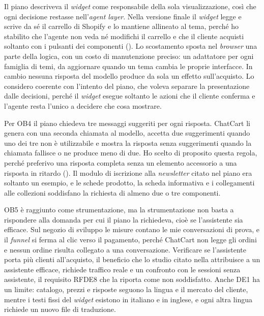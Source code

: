 Il piano descriveva il \emph{widget} come responsabile della sola visualizzazione, così che ogni
decisione restasse nell’\emph{agent layer}. Nella versione finale il \emph{widget} legge e scrive da
sé il carrello di Shopify e lo mantiene allineato al tema, perché ho stabilito che l’agente non veda
né modifichi il carrello e che il cliente acquisti soltanto con i pulsanti dei componenti
(). Lo scostamento sposta nel \emph{browser} una parte della logica, con un costo
di manutenzione preciso: un adattatore per ogni famiglia di temi, da aggiornare quando un tema
cambia le proprie interfacce. In cambio nessuna risposta del modello produce da sola un effetto
sull’acquisto. Lo considero coerente con l’intento del piano, che voleva separare la presentazione
dalle decisioni, perché il \emph{widget} esegue soltanto le azioni che il cliente conferma e
l’agente resta l’unico a decidere che cosa mostrare.

Per OB4 il piano chiedeva tre messaggi suggeriti per ogni risposta. ChatCart li genera con una
seconda chiamata al modello, accetta due suggerimenti quando uno dei tre non è utilizzabile e mostra
la risposta senza suggerimenti quando la chiamata fallisce o ne produce meno di due. Ho scelto di
proposito questa regola, perché preferivo una risposta completa senza un elemento accessorio a una
risposta in ritardo (). Il modulo di iscrizione alla \emph{newsletter} citato nel
piano era soltanto un esempio, e le schede prodotto, la scheda informativa e i collegamenti alle
collezioni soddisfano la richiesta di almeno due o tre componenti.

OB5 è raggiunto come strumentazione, ma la strumentazione non basta a rispondere alla domanda per
cui il piano la richiedeva, cioè se l’assistente sia efficace. Sul negozio di sviluppo le misure
contano le mie conversazioni di prova, e il \emph{funnel} si ferma al clic verso il pagamento,
perché ChatCart non legge gli ordini e nessun ordine risulta collegato a una conversazione.
Verificare se l’assistente porta più clienti all’acquisto, il beneficio che lo studio citato nella
 attribuisce a un assistente efficace, richiede traffico reale e un
confronto con le sessioni senza assistente, il requisito RFDE8 che la 
riporta come non soddisfatto. Anche DE1 ha un limite: catalogo, prezzi e risposte seguono la lingua
e il mercato del cliente, mentre i testi fissi del \emph{widget} esistono in italiano e in inglese,
e ogni altra lingua richiede un nuovo file di traduzione.

